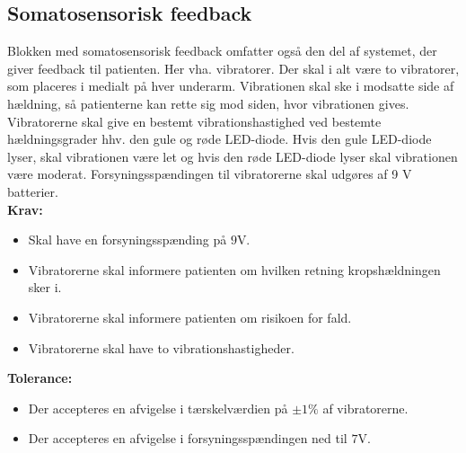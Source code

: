 \subsection{Somatosensorisk feedback} 
Blokken med somatosensorisk feedback omfatter også den del af systemet, der giver feedback til patienten. Her vha. vibratorer. Der skal i alt være to vibratorer, som placeres i medialt på hver underarm. Vibrationen skal ske i modsatte side af hældning, så patienterne kan rette sig mod siden, hvor vibrationen gives. Vibratorerne skal give en bestemt vibrationshastighed ved bestemte hældningsgrader hhv. den gule og røde LED-diode. Hvis den gule LED-diode lyser, skal vibrationen være let og hvis den røde LED-diode lyser skal vibrationen være moderat. Forsyningsspændingen til vibratorerne skal udgøres af 9 V batterier.
\\
\textbf{Krav:}
\begin{itemize}
	\item Skal have en forsyningsspænding på $9$V.
	\item Vibratorerne skal informere patienten om hvilken retning kropshældningen sker i.
	\item Vibratorerne skal informere patienten om risikoen for fald.
	\item Vibratorerne skal have to vibrationshastigheder.
\end{itemize}
\textbf{Tolerance:}
\begin{itemize}
	\item Der accepteres en afvigelse i tærskelværdien på $\pm1\%$ af vibratorerne.
	\item Der accepteres en afvigelse i forsyningsspændingen ned til $7$V.
\end{itemize}

